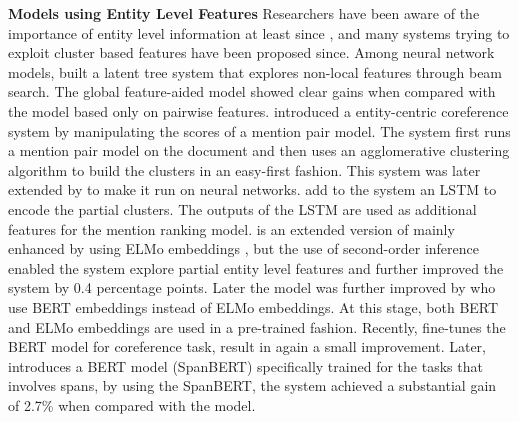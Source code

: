 \documentclass[10pt, a4paper]{article}
\begin{document}
\textbf{Models using Entity Level Features}
Researchers have been aware of 
the importance of  entity level information 
at least since 
, and many systems trying to  exploit  cluster based features have been proposed since.
Among neural network models,
 built a latent tree system that explores non-local features through beam search. 
The global feature-aided model showed clear gains when compared with the model based only on pairwise features. 
 introduced a entity-centric coreference system by manipulating the scores of a mention pair model. 
The system first runs a mention pair model on the document and then uses an agglomerative clustering algorithm to build the clusters in an easy-first fashion.
This system was later extended by  to make it run on neural networks. 
 add to the  system an LSTM to encode the partial clusters. 
The outputs of the LSTM are used as additional features for the mention ranking model. 
is an extended version of  mainly  enhanced by using ELMo embeddings \cite{peters2018elmo}, 
but the use of  second-order inference enabled the system explore partial entity level features and further improved the system by 0.4 percentage points. 
Later the model was further improved by  who use  BERT embeddings \cite{devlin2019bert} instead of ELMo embeddings. 
At this stage, both BERT and ELMo embeddings are used in a pre-trained fashion. 
Recently,  fine-tunes the BERT model for coreference task, result in again a small improvement. Later,  introduces a BERT model (SpanBERT) specifically trained for the tasks that involves spans, by using the SpanBERT, the system achieved a substantial gain of 2.7\% when compared with the  model.
\end{document}
